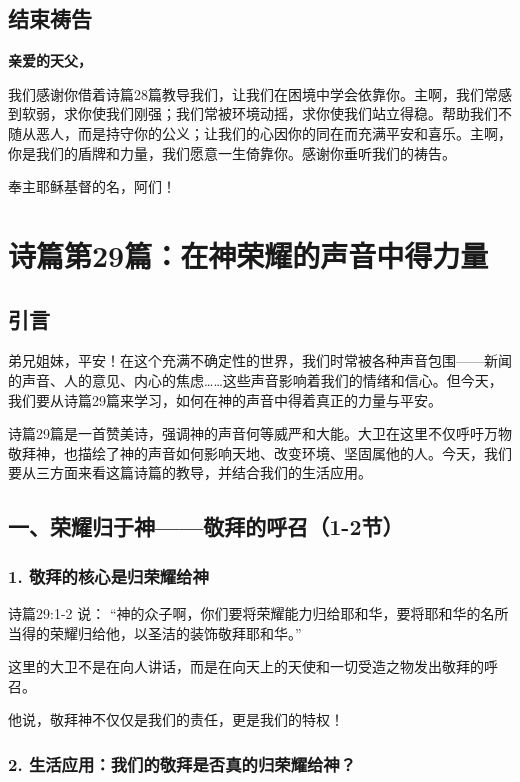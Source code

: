 \documentclass[a4paper, 12pt]{article}
\begin{document}
\subsection*{结束祷告}

\textbf{亲爱的天父，}

我们感谢你借着诗篇28篇教导我们，让我们在困境中学会依靠你。主啊，我们常感到软弱，求你使我们刚强；我们常被环境动摇，求你使我们站立得稳。帮助我们不随从恶人，而是持守你的公义；让我们的心因你的同在而充满平安和喜乐。主啊，你是我们的盾牌和力量，我们愿意一生倚靠你。感谢你垂听我们的祷告。

奉主耶稣基督的名，阿们！
\newpage
\section{诗篇第29篇：在神荣耀的声音中得力量}
\subsection*{引言}
\hspace{0.6cm}弟兄姐妹，平安！在这个充满不确定性的世界，我们时常被各种声音包围——新闻的声音、人的意见、内心的焦虑……这些声音影响着我们的情绪和信心。但今天，我们要从诗篇29篇来学习，如何在神的声音中得着真正的力量与平安。

诗篇29篇是一首赞美诗，强调神的声音何等威严和大能。大卫在这里不仅呼吁万物敬拜神，也描绘了神的声音如何影响天地、改变环境、坚固属他的人。今天，我们要从三方面来看这篇诗篇的教导，并结合我们的生活应用。

\subsection*{一、荣耀归于神——敬拜的呼召（1-2节）}
\subsubsection*{1. 敬拜的核心是归荣耀给神}
\hspace{0.6cm}诗篇29:1-2 说：
“神的众子啊，你们要将荣耀能力归给耶和华，要将耶和华的名所当得的荣耀归给他，以圣洁的装饰敬拜耶和华。”


这里的大卫不是在向人讲话，而是在向天上的天使和一切受造之物发出敬拜的呼召。

他说，敬拜神不仅仅是我们的责任，更是我们的特权！
\subsubsection*{2. 生活应用：我们的敬拜是否真的归荣耀给神？}
\end{document}
